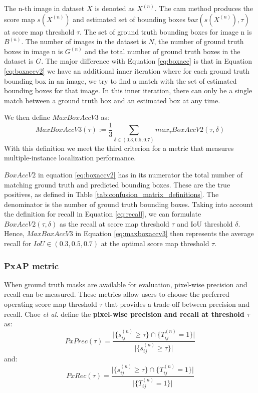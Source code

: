 The n-th image in dataset $X$ is denoted as $X^{(n)}$. The \acrshort{cam} method produces the score map $s(X^{(n)})$ and estimated set of bounding boxes $box(s(X^{(n)}),\tau)$ at score map threshold $\tau$. The set of ground truth bounding boxes for image n is $B^{(n)}$. The number of images in the dataset is $N$, the number of ground truth boxes in image n is $G^{(n)}$ and the total number of ground truth boxes in the dataset is $G$. The major difference with Equation \ref{eq:boxacc} is that in Equation \ref{eq:boxaccv2} we have an additional inner iteration where for each ground truth bounding box in an image, we try to find a match with the set of estimated bounding boxes for that image. In this inner iteration, there can only be a single match between a ground truth box and an estimated box at any time.

We then define $MaxBoxAccV3$ as:
\begin{equation} \label{eq:maxboxaccv3}
    MaxBoxAccV3(\tau) := \frac{1}{3} \sum_{\delta \in (0.3,0.5,0.7)} max_{\tau} BoxAccV2(\tau,\delta)
\end{equation}
With this definition we meet the third criterion for a metric that measures multiple-instance localization performance.

$BoxAccV2$ in equation \ref{eq:boxaccv2} has in its numerator the total number of matching ground truth and predicted bounding boxes. These are the true positives, as defined in Table \ref{tab:confusion_matrix_definitions}. The denominator is the number of ground truth bounding boxes. Taking into account the definition for recall in Equation \ref{eq:recall}, we can formulate $BoxAccV2(\tau, \delta)$ as the recall at score map threshold $\tau$ and IoU threshold $\delta$. Hence, $MaxBoxAccV3$ in Equation \ref{eq:maxboxaccv3} then represents the average recall for $IoU \in (0.3, 0.5, 0.7)$ at the optimal score map threshold $\tau$.

\subsubsection{PxAP metric}
When ground truth masks are available for evaluation, pixel-wise precision and recall can be measured. These metrics allow users to choose the preferred operating score map threshold $\tau$ that provides a trade-off between precision and recall. Choe \textit{et al.} define the \textbf{pixel-wise precision and recall at threshold $\tau$} as:
\begin{equation} \label{eq:pxprec}
    PxPrec(\tau) = \frac{\lvert \{ s^{(n)}_{ij} \ge \tau \} \cap \{ T^{(n)}_{ij} = 1 \} \rvert}{\lvert \{ s^{(n)}_{ij} \ge \tau \} \rvert}
\end{equation}
and:
\begin{equation} \label{eq:pxrec}
    PxRec(\tau) = \frac{\lvert \{ s^{(n)}_{ij} \ge \tau \} \cap \{ T^{(n)}_{ij} = 1 \} \rvert}{\lvert \{ T^{(n)}_{ij} = 1 \} \rvert}
\end{equation}

